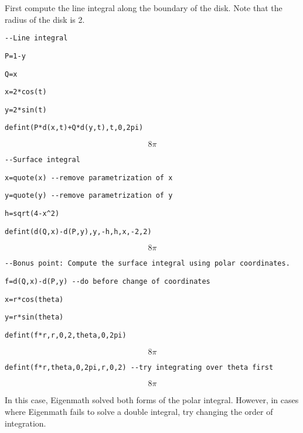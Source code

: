 \medskip
\noindent
First compute the line integral along the boundary of the disk.
Note that the radius of the disk is 2.

\medskip
\verb$--Line integral$

\verb$P=1-y$

\verb$Q=x$

\verb$x=2*cos(t)$

\verb$y=2*sin(t)$

\verb$defint(P*d(x,t)+Q*d(y,t),t,0,2pi)$

$$8\pi$$

\verb$--Surface integral$

\verb$x=quote(x) --remove parametrization of x$

\verb$y=quote(y) --remove parametrization of y$

\verb$h=sqrt(4-x^2)$

\verb$defint(d(Q,x)-d(P,y),y,-h,h,x,-2,2)$

$$8\pi$$

\verb$--Bonus point: Compute the surface integral using polar coordinates.$

\verb$f=d(Q,x)-d(P,y) --do before change of coordinates$

\verb$x=r*cos(theta)$

\verb$y=r*sin(theta)$

\verb$defint(f*r,r,0,2,theta,0,2pi)$

$$8\pi$$

\verb$defint(f*r,theta,0,2pi,r,0,2) --try integrating over theta first$

$$8\pi$$

\medskip
\noindent
In this case, Eigenmath solved both forms of the polar integral.
However, in cases where Eigenmath fails to solve a double integral, try
changing the order of integration.
